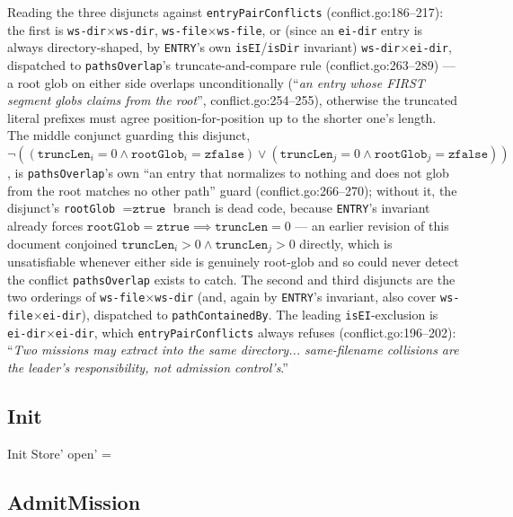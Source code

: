 \documentclass[a4paper,10pt,fleqn]{article}
\newcommand{\field}[1]{\texttt{#1}}
\begin{document}
Reading the three disjuncts against \field{entryPairConflicts}
(conflict.go:186--217): the first is \texttt{ws-dir}$\times$\texttt{ws-dir},
\texttt{ws-file}$\times$\texttt{ws-file}, or (since an \texttt{ei-dir}
entry is always directory-shaped, by \field{ENTRY}'s own
\field{isEI}/\field{isDir} invariant) \texttt{ws-dir}$\times$\texttt{ei-dir},
dispatched to \field{pathsOverlap}'s truncate-and-compare rule
(conflict.go:263--289) --- a root glob on either side overlaps
unconditionally (``\emph{an entry whose FIRST segment globs claims
from the root}'', conflict.go:254--255), otherwise the truncated
literal prefixes must agree position-for-position up to the shorter
one's length. The middle conjunct guarding this disjunct,
$\lnot((\field{truncLen}_i = 0 \land \field{rootGlob}_i = \field{zfalse})
\lor (\field{truncLen}_j = 0 \land \field{rootGlob}_j = \field{zfalse}))$,
is \field{pathsOverlap}'s own ``an entry that normalizes to nothing
and does not glob from the root matches no other path'' guard
(conflict.go:266--270); without it, the disjunct's
\field{rootGlob} $= \field{ztrue}$ branch is dead code, because
\field{ENTRY}'s invariant already forces $\field{rootGlob} =
\field{ztrue} \implies \field{truncLen} = 0$ --- an earlier revision
of this document conjoined $\field{truncLen}_i > 0 \land
\field{truncLen}_j > 0$ directly, which is unsatisfiable whenever
either side is genuinely root-glob and so could never detect the
conflict \field{pathsOverlap} exists to catch. The second and third
disjuncts are the two orderings of
\texttt{ws-file}$\times$\texttt{ws-dir} (and, again by \field{ENTRY}'s
invariant, also cover \texttt{ws-file}$\times$\texttt{ei-dir}),
dispatched to \field{pathContainedBy}. The leading \field{isEI}-exclusion
is \texttt{ei-dir}$\times$\texttt{ei-dir}, which
\field{entryPairConflicts} always refuses (conflict.go:196--202):
``\emph{Two missions may extract into the same directory... same-filename
collisions are the leader's responsibility, not admission control's}.''

\subsection{Init}

\begin{schema}{Init}
Store'
\where
open' = \emptyset
\end{schema}

\subsection{AdmitMission}
\end{document}
